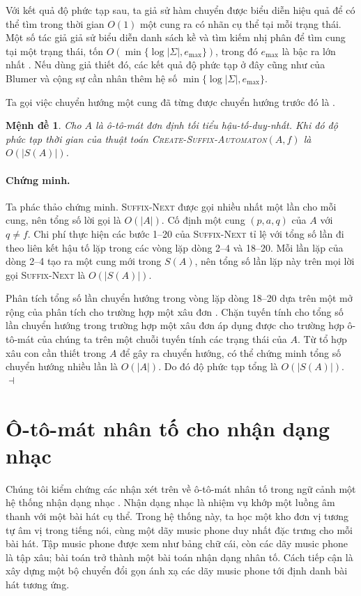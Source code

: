 \documentclass[11pt]{article}
\newtheorem{proposition}{Mệnh đề}
\newenvironment{proof}{\paragraph{Chứng minh.}}{\hfill$\dashv$\par}
\begin{document}
Với kết quả độ phức tạp sau, ta giả sử hàm chuyển được biểu diễn hiệu quả để
có thể tìm trong thời gian $O(1)$ một cung ra có nhãn cụ thể tại mỗi trạng
thái. Một số tác giả giả sử biểu diễn danh sách kề và tìm kiếm nhị phân để tìm
cung tại một trạng thái, tốn $O(\min\{\log|\Sigma|,e_{\max}\})$, trong đó
$e_{\max}$ là bậc ra lớn nhất \cite{crochemore-transducers,crochemore-rytter}.
Nếu dùng giả thiết đó, các kết quả độ phức tạp ở đây cũng như của Blumer và
cộng sự \cite{blumer-smallest,blumer-complete} cần nhân thêm hệ số
$\min\{\log|\Sigma|,e_{\max}\}$.

Ta gọi việc chuyển hướng một cung đã từng được chuyển hướng trước đó là
.

\begin{proposition}
Cho $A$ là ô-tô-mát đơn định tối tiểu hậu-tố-duy-nhất. Khi đó độ phức tạp thời
gian của thuật toán \textsc{Create-Suffix-Automaton}$(A,f)$ là $O(|S(A)|)$.
\end{proposition}

\begin{proof}
Ta phác thảo chứng minh. \textsc{Suffix-Next} được gọi nhiều nhất một lần cho
mỗi cung, nên tổng số lời gọi là $O(|A|)$. Cố định một cung $(p,a,q)$ của $A$
với $q\ne f$. Chi phí thực hiện các bước 1--20 của \textsc{Suffix-Next} tỉ lệ
với tổng số lần đi theo liên kết hậu tố lặp trong các vòng lặp dòng 2--4 và
18--20. Mỗi lần lặp của dòng 2--4 tạo ra một cung mới trong $S(A)$, nên tổng
số lần lặp này trên mọi lời gọi \textsc{Suffix-Next} là $O(|S(A)|)$.

Phân tích tổng số lần chuyển hướng trong vòng lặp dòng 18--20 dựa trên một mở
rộng của phân tích cho trường hợp một xâu đơn \cite{blumer-thesis,blumer-complete}.
Chặn tuyến tính cho tổng số lần chuyển hướng trong trường hợp một xâu đơn áp
dụng được cho trường hợp ô-tô-mát của chúng ta trên một chuỗi tuyến tính các
trạng thái của $A$. Từ tổ hợp xâu con cần thiết trong $A$ để gây ra chuyển
hướng, có thể chứng minh tổng số chuyển hướng nhiều lần là $O(|A|)$. Do đó độ
phức tạp tổng là $O(|S(A)|)$.
\end{proof}

\section{Ô-tô-mát nhân tố cho nhận dạng nhạc}

Chúng tôi kiểm chứng các nhận xét trên về ô-tô-mát nhân tố trong ngữ cảnh một
hệ thống nhận dạng nhạc \cite{weinstein-music,mohri-robust}. Nhận dạng nhạc là
nhiệm vụ khớp một luồng âm thanh với một bài hát cụ thể. Trong hệ thống này,
ta học một kho đơn vị  tương tự âm vị trong tiếng nói, cùng
một dãy music phone duy nhất đặc trưng cho mỗi bài hát. Tập music phone được
xem như bảng chữ cái, còn các dãy music phone là tập xâu; bài toán trở thành
một bài toán nhận dạng nhân tố. Cách tiếp cận là xây dựng một bộ chuyển đổi
gọn ánh xạ các dãy music phone tới định danh bài hát tương ứng.
\end{document}
